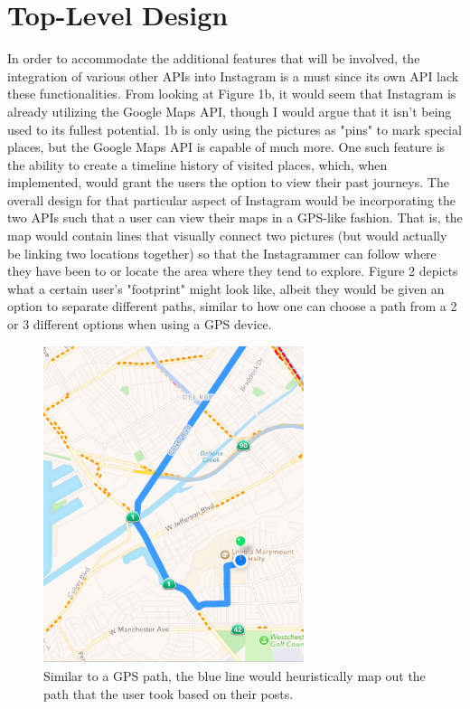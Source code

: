 \documentclass[11pt]{article}
\begin{document}
\section{Top-Level Design}
\label{Top-Level Design}
   \indent 
   \indent In order to accommodate the additional features that will be involved, the integration of various other APIs into Instagram is a must since its own API lack these functionalities. From looking at Figure 1b, it would seem that Instagram is already utilizing the Google Maps API, though I would argue that it isn't being used to its fullest potential. 1b is only using the pictures as "pins" to mark special places, but the Google Maps API is capable of much more. One such feature is the ability to create a timeline history of visited places, which, when implemented, would grant the users the option to view their past journeys. The overall design for that particular aspect of Instagram would be incorporating the two APIs such that a user can view their maps in a GPS-like fashion. That is, the map would contain lines that visually connect two pictures (but would actually be linking two locations together) so that the Instagrammer can follow where they have been to or locate the area where they tend to explore. Figure 2 depicts what a certain user's "footprint" might look like, albeit they would be given an option to separate different paths, similar to how one can choose a path from a 2 or 3 different options when using a GPS device. \\
   
\begin{figure}[ht]
\centering
\includegraphics[width=3in]{images/gps.png}
\caption{Similar to a GPS path, the blue line would heuristically map out the path that the user took based on their posts.}
\label{travel_history}
\end{figure}
\end{document}
